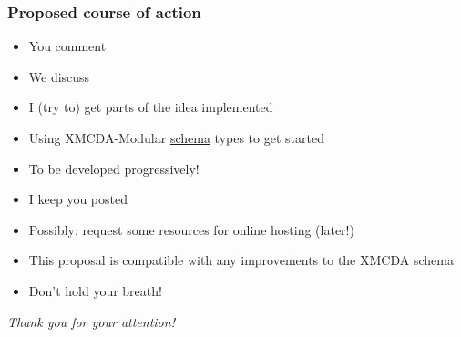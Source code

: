 \documentclass[french,english]{beamer}
\begin{document}
\begin{frame}
	\frametitle{Proposed course of action}
	\begin{itemize}
		\item You comment
		\item We discuss
		\item I (try to) get parts of the idea implemented
		\item Using XMCDA-Modular \href{https://github.com/xmcda-modular/schema}{schema} types to get started
		\item To be developed progressively!
		\item I keep you posted
		\item Possibly: request some resources for online hosting (later!)
		\item This proposal is compatible with any improvements to the XMCDA schema
		\item Don’t hold your breath!
	\end{itemize}
\end{frame}

\begin{frame}[plain]
	\addtocounter{framenumber}{-1}
	\begin{center}
		\huge
		\textit{Thank you for your attention!}
	\end{center}
\end{frame}

\appendix
\AtBeginSection{
}
\end{document}
